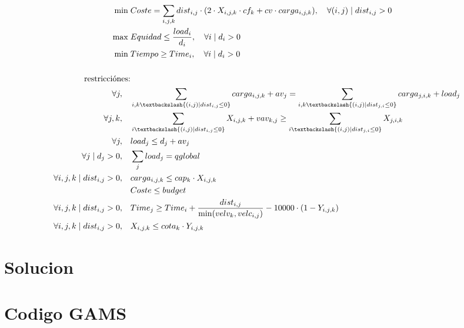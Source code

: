 \documentclass[]{article}
\begin{document}
\begin{align*}
	\min \; & Coste = \sum_{i,j,k} dist_{i,j}\cdot (2\cdot X_{i,j,k}\cdot cf_{k}+cv\cdot carga_{i,j,k}), \quad \forall (i,j) \mid dist_{i,j} > 0\\
	\max \; & Equidad \leq  \frac{load_i}{d_i}, \quad \forall i \mid d_i > 0\\
	\min \; & Tiempo \geq Time_i, \quad \forall i \mid d_i > 0\\ \\
	\text{restricciónes:}&\\
	\forall j, \quad &\sum_{i,k \textbackslash \{(i,j) \mid dist_{i,j} \leq 0\}} carga_{i,j,k} + av_j = \sum_{i,k \textbackslash \{(i,j) \mid dist_{j,i} \leq 0\}}  carga_{j,i,k} + load_j\\
	\forall j,k, \quad &\sum_{i \textbackslash \{(i,j) \mid dist_{i,j} \leq 0\}} X_{i,j,k} + vav_{k,j} \geq \sum_{i \textbackslash \{(i,j) \mid dist_{j,i} \leq 0\}} X_{j,i,k}\\
	\forall j, \quad &load_j \leq d_j + av_j\\
	\forall j \mid d_j > 0, \quad &\sum_j load_j = qglobal\\
	\forall i,j,k \mid dist_{i,j} > 0, \quad & carga_{i,j,k} \leq cap_k \cdot X_{i,j,k}\\
	& Coste \leq budget\\
	\forall i,j,k \mid dist_{i,j} > 0, \quad & Time_j \geq Time_i + \frac{dist_{i,j}}{\min(velv_k, velc_{i,j})} - 10000\cdot (1-Y_{i,j,k})\\
	\forall i,j,k \mid dist_{i,j} > 0, \quad & X_{i,j,k} \leq cota_k \cdot Y_{i,j,k}
\end{align*}

\section{Solucion}

\section{Codigo GAMS}
\end{document}

